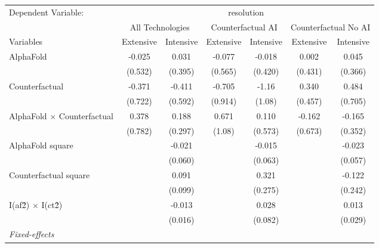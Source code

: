 \begingroup
\centering
\begin{tabular}{lcccccc}
   \tabularnewline \midrule \midrule
   Dependent Variable: & \multicolumn{6}{c}{resolution}\\
 & \multicolumn{2}{c}{All Technologies} & \multicolumn{2}{c}{Counterfactual AI} & \multicolumn{2}{c}{Counterfactual No AI} \\
\cmidrule(lr){1-1}\cmidrule(lr){2-3} \cmidrule(lr){4-5} \cmidrule(lr){6-7}
Variables & \multicolumn{1}{c}{Extensive} & \multicolumn{1}{c}{Intensive} & \multicolumn{1}{c}{Extensive} & \multicolumn{1}{c}{Intensive} & \multicolumn{1}{c}{Extensive} & \multicolumn{1}{c}{Intensive} \\
\cmidrule(lr){1-1}\cmidrule(lr){2-2} \cmidrule(lr){3-3} \cmidrule(lr){4-4} \cmidrule(lr){5-5} \cmidrule(lr){6-6} \cmidrule(lr){7-7}
   AlphaFold                          & -0.025  & 0.031   & -0.077  & -0.018  & 0.002   & 0.045\\   
                                      & (0.532) & (0.395) & (0.565) & (0.420) & (0.431) & (0.366)\\   
   Counterfactual                     & -0.371  & -0.411  & -0.705  & -1.16   & 0.340   & 0.484\\   
                                      & (0.722) & (0.592) & (0.914) & (1.08)  & (0.457) & (0.705)\\   
   AlphaFold $\times$ Counterfactual  & 0.378   & 0.188   & 0.671   & 0.110   & -0.162  & -0.165\\   
                                      & (0.782) & (0.297) & (1.08)  & (0.573) & (0.673) & (0.352)\\   
   AlphaFold square                   &         & -0.021  &         & -0.015  &         & -0.023\\   
                                      &         & (0.060) &         & (0.063) &         & (0.057)\\   
   Counterfactual square              &         & 0.091   &         & 0.321   &         & -0.122\\   
                                      &         & (0.099) &         & (0.275) &         & (0.242)\\   
   I(af\^2) $\times$ I(ct\^2)         &         & -0.013  &         & 0.028   &         & 0.013\\   
                                      &         & (0.016) &         & (0.082) &         & (0.029)\\   
   \midrule
   \emph{Fixed-effects}\\

\end{tabular}
